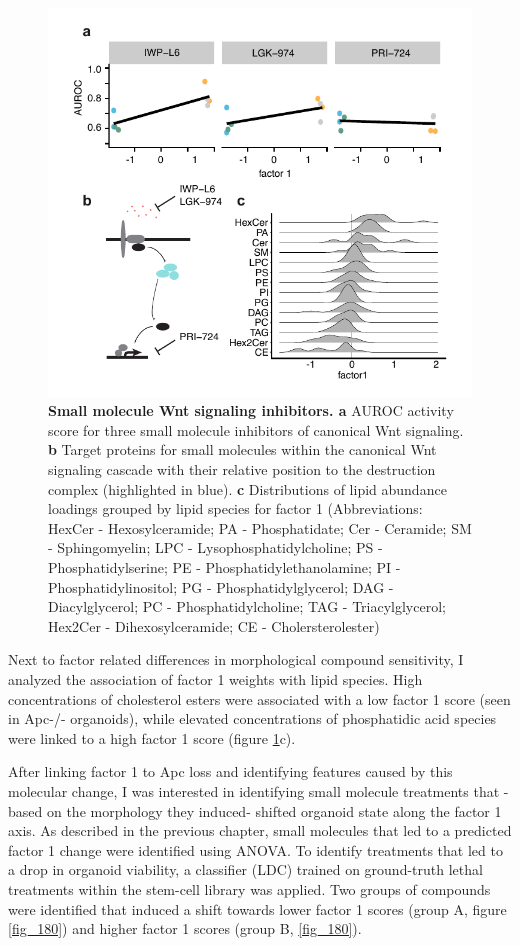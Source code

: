 \begin{flushleft}
\begin{figure}[h]
\centering
\includegraphics[scale=0.75,keepaspectratio]{figures/adenomaprofiling/pdf/fig_2_2.pdf}
\caption{\textbf{Small molecule Wnt signaling inhibitors. a} AUROC activity score for three small molecule inhibitors of canonical Wnt signaling. \textbf{b} Target proteins for small molecules within the canonical Wnt signaling cascade with their relative position to the destruction complex (highlighted in blue). \textbf{c} Distributions of lipid abundance loadings grouped by lipid species for factor 1 (Abbreviations: HexCer - Hexosylceramide; PA - Phosphatidate; Cer - Ceramide; SM - Sphingomyelin; LPC - Lysophosphatidylcholine; PS - Phosphatidylserine; PE - Phosphatidylethanolamine; PI - Phosphatidylinositol; PG - Phosphatidylglycerol; DAG - Diacylglycerol; PC - Phosphatidylcholine; TAG - Triacylglycerol; Hex2Cer - Dihexosylceramide; CE - Cholersterolester)}
\label{fig_199}
\end{figure}
\bigbreak

Next to factor related differences in morphological compound sensitivity, I analyzed the association of factor 1 weights with lipid species. High concentrations of cholesterol esters were associated with a low factor 1 score (seen in Apc-/- organoids), while elevated concentrations of phosphatidic acid species were linked to a high factor 1 score (figure \ref{fig_199}c).

After linking factor 1 to Apc loss and identifying features caused by this molecular change, I was interested in identifying small molecule treatments that -based on the morphology they induced- shifted organoid state along the factor 1 axis. As described in the previous chapter, small molecules that led to a predicted factor 1 change were identified using ANOVA. To identify treatments that led to a drop in organoid viability, a classifier (LDC) trained on ground-truth lethal treatments within the stem-cell library was applied. Two groups of compounds were identified that induced a shift towards lower factor 1 scores (group A, figure \ref{fig_180}) and higher factor 1 scores (group B, \ref{fig_180}). 


\end{flushleft}
